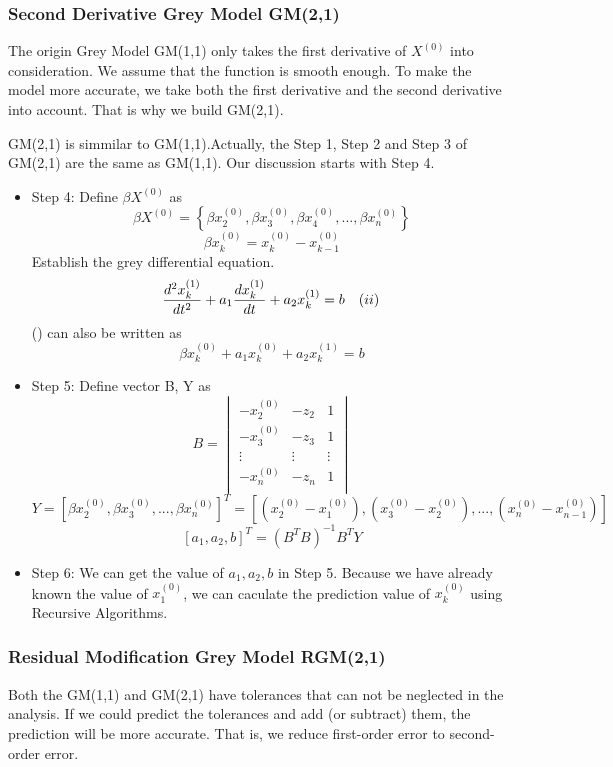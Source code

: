 \documentclass{mcmthesis}
\begin{document}
\subsubsection{Second Derivative Grey Model GM(2,1)}
The origin Grey Model GM(1,1) only takes the first derivative of $X^{(0)}$ into consideration. We assume that the function is smooth enough. To make the model more accurate, we take both the first derivative and the second derivative into account. That is why we build GM(2,1).

GM(2,1) is simmilar to GM(1,1).Actually, the Step 1, Step 2 and Step 3 of GM(2,1) are the same as GM(1,1). Our discussion starts with Step 4.
	\begin{itemize}
		\item Step 4: 
			Define $\beta X^{(0)}$ as
			$$
				\beta X^{(0)} = \left\{\beta x^{(0)}_2,\beta x^{(0)}_3,\beta x^{(0)}_4,...,\beta x^{(0)}_n \right\}
			$$
			$$
				\beta x^{(0)}_k = x^{(0)}_k - x^{(0)}_{k-1}
			$$
			Establish the grey differential equation.
			$$
			\frac{d^2x^{(1)}_k}{dt^2}+ a_1\frac{dx^{(1)}_k}{dt} + a_2x^{(1)}_k = b\quad (\uppercase\expandafter{\romannumeral2})
			$$
		 (\uppercase\expandafter{}) can also be written as 
		 $$
		 	\beta x^{(0)}_k+a_1x^{(0)}_k + a_2x^{(1)}_k = b
		 $$
		\item Step 5: Define vector B, Y as
		$$B = 
			\begin{vmatrix}
				-x^{(0)}_2 & -z_2 & 1\\
				-x^{(0)}_3 & -z_3 & 1\\
				\vdots & \vdots & \vdots\\
				-x^{(0)}_n & -z_n & 1\\
			\end{vmatrix}
		$$
		$$
		 	Y = [\beta x^{(0)}_2,\beta x^{(0)}_3,...,\beta x^{(0)}_n ]^T = [(x^{(0)}_2 - x^{(0)}_1), (x^{(0)}_3 - x^{(0)}_2),...,(x^{(0)}_n - x^{(0)}_{n-1})]
		$$
		$$
			[a_1,a_2,b]^T = (B^TB)^{-1}B^TY
		$$
		\item Step 6: We can get the value of $a_1,a_2,b$ in Step 5. Because we have already known the value of $x^{(0)}_1$, we can caculate the prediction value of $x^{(0)}_k$ using Recursive Algorithms.
	\end{itemize}

\subsubsection{Residual Modification Grey Model RGM(2,1)}
	Both the GM(1,1) and GM(2,1) have tolerances that can not be neglected in the analysis. If we could predict the tolerances and add (or subtract) them, the prediction will be more accurate. That is, we reduce first-order error to second-order error.
\end{document}
